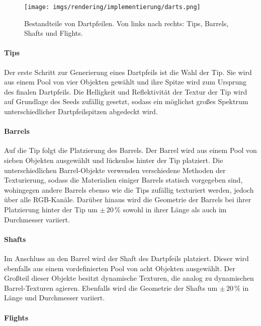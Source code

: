 \begin{figure}
    \centering
    \texttt{[image: imgs/rendering/implementierung/darts.png]}
    \caption{Bestandteile von Dartpfeilen. Von links nach rechts: Tips, Barrels, Shafts und Flights.}
    \label{img:darts_parts}
\end{figure}

\paragraph{Tips}

Der erste Schritt zur Generierung eines Dartpfeils ist die Wahl der Tip. Sie wird aus einem Pool von vier Objekten gewählt und ihre Spitze wird zum Ursprung des finalen Dartpfeils. Die Helligkeit und Reflektivität der Textur der Tip wird auf Grundlage des Seeds zufällig gesetzt, sodass ein möglichst großes Spektrum unterschiedlicher Dartpfeilspitzen abgedeckt wird.

\paragraph{Barrels}

Auf die Tip folgt die Platzierung des Barrels. Der Barrel wird aus einem Pool von sieben Objekten ausgewählt und lückenlos hinter der Tip platziert. Die unterschiedlichen Barrel-Objekte verwenden verschiedene Methoden der Texturierung, sodass die Materialien einiger Barrels statisch vorgegeben sind, wohingegen andere Barrels ebenso wie die Tips zufällig texturiert werden, jedoch über alle RGB-Kanäle. Darüber hinaus wird die Geometrie der Barrels bei ihrer Platzierung hinter der Tip um $\pm\,20\,\%$ sowohl in ihrer Länge als auch im Durchmesser variiert.

\paragraph{Shafts}

Im Anschluss an den Barrel wird der Shaft des Dartpfeils platziert. Dieser wird ebenfalls aus einem vordefinierten Pool von acht Objekten ausgewählt. Der Großteil dieser Objekte besitzt dynamische Texturen, die analog zu dynamischen Barrel-Texturen agieren. Ebenfalls wird die Geometrie der Shafts um $\pm\,20\,\%$ in Länge und Durchmesser variiert.

\paragraph{Flights}

